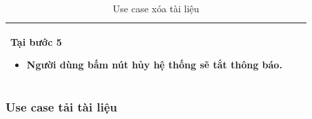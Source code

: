 \documentclass[12pt,a4paper]{article}
\begin{document}
\begin{table}[H]
\begin{tabular}{|p{3.5cm}|p{11.5cm}|c|}
            Tại bước 5\newline
            \vspace{-.8cm}\begin{itemize}
                              \item Người dùng bấm nút hủy hệ thống sẽ tắt thông báo.
            \end{itemize} \\
            \hline
        \end{tabular}
        \caption{Use case xóa tài liệu }

    \end{table}


    \subsubsection*{Use case tải tài liệu}
\end{document}
